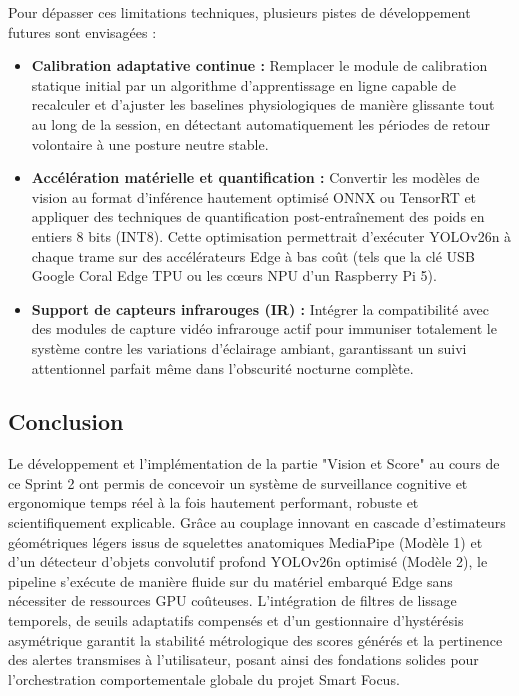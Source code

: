 Pour dépasser ces limitations techniques, plusieurs pistes de développement futures sont envisagées :
\begin{itemize}
    \item \textbf{Calibration adaptative continue :} Remplacer le module de calibration statique initial par un algorithme d'apprentissage en ligne capable de recalculer et d'ajuster les baselines physiologiques de manière glissante tout au long de la session, en détectant automatiquement les périodes de retour volontaire à une posture neutre stable.
    \item \textbf{Accélération matérielle et quantification :} Convertir les modèles de vision au format d'inférence hautement optimisé ONNX ou TensorRT et appliquer des techniques de quantification post-entraînement des poids en entiers 8 bits (INT8). Cette optimisation permettrait d'exécuter YOLOv26n à chaque trame sur des accélérateurs Edge à bas coût (tels que la clé USB Google Coral Edge TPU ou les cœurs NPU d'un Raspberry Pi 5).
    \item \textbf{Support de capteurs infrarouges (IR) :} Intégrer la compatibilité avec des modules de capture vidéo infrarouge actif pour immuniser totalement le système contre les variations d'éclairage ambiant, garantissant un suivi attentionnel parfait même dans l'obscurité nocturne complète.
\end{itemize}

\subsection{Conclusion}

Le développement et l'implémentation de la partie "Vision et Score" au cours de ce Sprint 2 ont permis de concevoir un système de surveillance cognitive et ergonomique temps réel à la fois hautement performant, robuste et scientifiquement explicable. Grâce au couplage innovant en cascade d'estimateurs géométriques légers issus de squelettes anatomiques MediaPipe (Modèle 1) et d'un détecteur d'objets convolutif profond YOLOv26n optimisé (Modèle 2), le pipeline s'exécute de manière fluide sur du matériel embarqué Edge sans nécessiter de ressources GPU coûteuses. L'intégration de filtres de lissage temporels, de seuils adaptatifs compensés et d'un gestionnaire d'hystérésis asymétrique garantit la stabilité métrologique des scores générés et la pertinence des alertes transmises à l'utilisateur, posant ainsi des fondations solides pour l'orchestration comportementale globale du projet Smart Focus.
